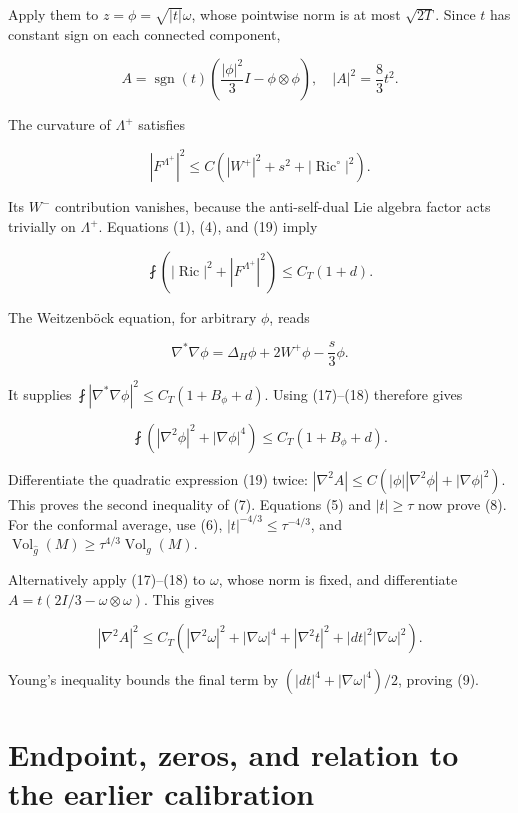 \documentclass[
]{article}
\begin{document}
Apply them to \(z=\phi=\sqrt{|t|}\omega\), whose pointwise norm is at
most \(\sqrt{2T}\). Since \(t\) has constant sign on each connected
component,

\[
 A=\operatorname{sgn}(t)\left(\frac{|\phi|^2}{3}I
                                      -\phi\otimes\phi\right),
 \quad |A|^2=\frac83t^2.
 \tag{19}
\]

The curvature of \(\Lambda^+\) satisfies

\[
 |F^{\Lambda^+}|^2\le C\left(|W^+|^2+s^2+|\operatorname{Ric}^{\circ}|^2\right).
 \tag{20}
\]

Its \(W^-\) contribution vanishes, because the anti-self-dual Lie
algebra factor acts trivially on \(\Lambda^+\). Equations (1), (4), and
(19) imply

\[
 \fint\left(|\operatorname{Ric}|^2+|F^{\Lambda^+}|^2\right)
 \le C_T(1+d).
\]

The Weitzenböck equation, for arbitrary \(\phi\), reads

\[
 \nabla^*\nabla\phi
       =\Delta_H\phi+2W^+\phi-\frac{s}{3}\phi.
\]

It supplies \(\fint|\nabla^*\nabla\phi|^2\le C_T(1+B_\phi+d)\). Using
(17)--(18) therefore gives

\[
 \fint\left(|\nabla^2\phi|^2+|\nabla\phi|^4\right)
                    \le C_T(1+B_\phi+d).
 \tag{21}
\]

Differentiate the quadratic expression (19) twice:
\(|\nabla^2A|\le C(|\phi||\nabla^2\phi|+|\nabla\phi|^2)\). This proves
the second inequality of (7). Equations (5) and \(|t|\ge\tau\) now prove
(8). For the conformal average, use (6), \(|t|^{-4/3}\le\tau^{-4/3}\),
and
\(\operatorname{Vol}_{\widehat g}(M)\ge\tau^{4/3}\operatorname{Vol}_g(M)\).

Alternatively apply (17)--(18) to \(\omega\), whose norm is fixed, and
differentiate \(A=t(2I/3-\omega\otimes\omega)\). This gives

\[
 |\nabla^2A|^2\le C_T\left(|\nabla^2\omega|^2+|\nabla\omega|^4
                       +|\nabla^2t|^2+|dt|^2|\nabla\omega|^2\right).
\]

Young's inequality bounds the final term by
\((|dt|^4+|\nabla\omega|^4)/2\), proving (9).

\hypertarget{endpoint-zeros-and-relation-to-the-earlier-calibration}{%
\section{Endpoint, zeros, and relation to the earlier
calibration}\label{endpoint-zeros-and-relation-to-the-earlier-calibration}}
\end{document}
